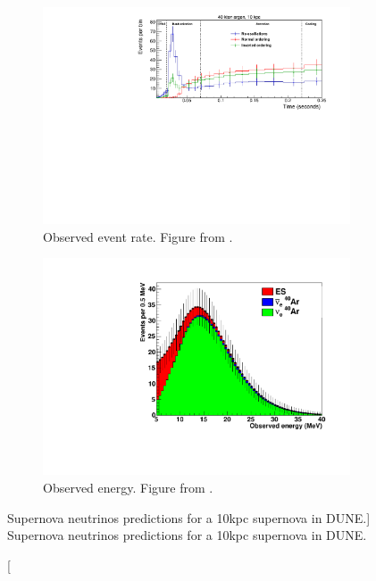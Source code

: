 {\begin{figure}
	\centering
	\begin{subfigure}[b]{\textwidth}
		\includegraphics[width=\textwidth]{figures/sn_time.pdf}
		\caption [Observed event rate.]{Observed event rate. Figure from \cite{Abi:2020evt}.}
		\label{fig:sn_time}
	\end{subfigure}
	\begin{subfigure}[b]{\textwidth}
		\centering
		\includegraphics[width=\textwidth]{figures/sn_energy.pdf}
		\caption [Observed energy.]{Observed energy. Figure from \cite{Acciarri:2015uup}.}
		\label{fig:sn_energy}
	\end{subfigure}
	\caption
	[Supernova neutrinos predictions for a 10kpc supernova in DUNE.]
	{Supernova neutrinos predictions for a 10kpc supernova in DUNE.}
	\label{fig:sn_nus}
\end{figure}

}
